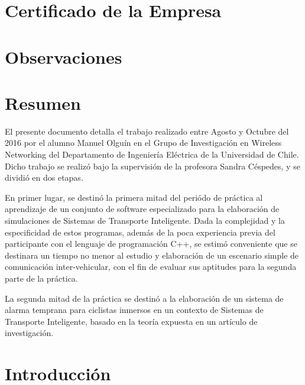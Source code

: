 \documentclass[11pt,letterpaper]{article}
\begin{document}

\renewcommand{\sectionmark}[1]{\markright{\thesection.\ #1}}
\renewcommand{\headrulewidth}{0.5pt}
\renewcommand{\footrulewidth}{0.5pt}

\newpage
\section{Certificado de la Empresa}
\newpage
\section{Observaciones}
\newpage

\tableofcontents
\listoffigures

\newpage
\section{Resumen}

El presente documento detalla el trabajo realizado entre Agosto y Octubre del 2016 por el alumno Manuel Olguín en el Grupo de Investigación en Wireless Networking del Departamento de Ingeniería Eléctrica de la Universidad de Chile. Dicho trabajo se realizó bajo la supervisión de la profesora Sandra Céspedes, y se dividió en dos etapas.

En primer lugar, se destinó la primera mitad del periódo de práctica al aprendizaje de un conjunto de software especializado para la elaboración de simulaciones de Sistemas de Transporte Inteligente. Dada la complejidad y la especificidad de estos programas, además de la poca experiencia previa del participante con el lenguaje de programación C++, se estimó conveniente que se destinara un tiempo no menor al estudio y elaboración de un escenario simple de comunicación inter-vehicular, con el fin de evaluar sus aptitudes para la segunda parte de la práctica.

La segunda mitad de la práctica se destinó a la elaboración de un sistema de alarma temprana para ciclistas inmersos en un contexto de Sistemas de Transporte Inteligente, basado en la teoría expuesta en un artículo de investigación.

\newpage
\section{Introducción}
\end{document}
